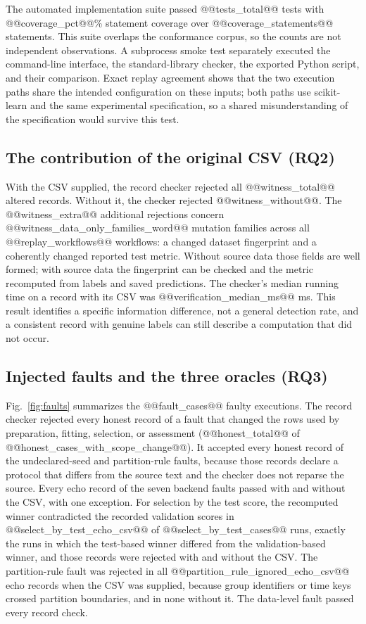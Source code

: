 \documentclass[lettersize,journal]{IEEEtran}
\begin{document}
The automated implementation suite passed @@tests_total@@ tests with @@coverage_pct@@\% statement coverage over @@coverage_statements@@ statements. This suite overlaps the conformance corpus, so the counts are not independent observations. A subprocess smoke test separately executed the command-line interface, the standard-library checker, the exported Python script, and their comparison. Exact replay agreement shows that the two execution paths share the intended configuration on these inputs; both paths use scikit-learn and the same experimental specification, so a shared misunderstanding of the specification would survive this test.

\subsection{The contribution of the original CSV (RQ2)}
With the CSV supplied, the record checker rejected all @@witness_total@@ altered records. Without it, the checker rejected @@witness_without@@. The @@witness_extra@@ additional rejections concern @@witness_data_only_families_word@@ mutation families across all @@replay_workflows@@ workflows: a changed dataset fingerprint and a coherently changed reported test metric. Without source data those fields are well formed; with source data the fingerprint can be checked and the metric recomputed from labels and saved predictions. The checker's median running time on a record with its CSV was @@verification_median_ms@@ ms. This result identifies a specific information difference, not a general detection rate, and a consistent record with genuine labels can still describe a computation that did not occur.

\subsection{Injected faults and the three oracles (RQ3)}
Fig.~\ref{fig:faults} summarizes the @@fault_cases@@ faulty executions. The record checker rejected every honest record of a fault that changed the rows used by preparation, fitting, selection, or assessment (@@honest_total@@ of @@honest_cases_with_scope_change@@). It accepted every honest record of the undeclared-seed and partition-rule faults, because those records declare a protocol that differs from the source text and the checker does not reparse the source. Every echo record of the seven backend faults passed with and without the CSV, with one exception. For selection by the test score, the recomputed winner contradicted the recorded validation scores in @@select_by_test_echo_csv@@ of @@select_by_test_cases@@ runs, exactly the runs in which the test-based winner differed from the validation-based winner, and those records were rejected with and without the CSV. The partition-rule fault was rejected in all @@partition_rule_ignored_echo_csv@@ echo records when the CSV was supplied, because group identifiers or time keys crossed partition boundaries, and in none without it. The data-level fault passed every record check.
\end{document}
